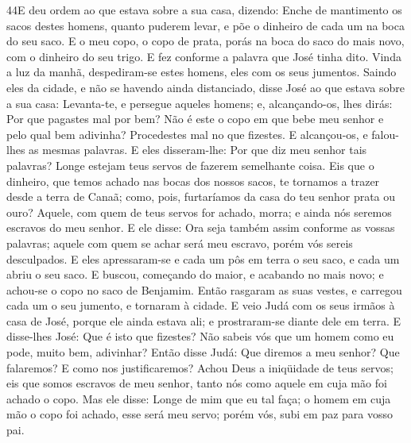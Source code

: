 \lettrine{44} E deu ordem ao que estava sobre a sua casa,
dizendo: Enche de mantimento os sacos destes homens, quanto puderem
levar, e põe o dinheiro de cada um na boca do seu saco. E o meu
copo, o copo de prata, porás na boca do saco do mais novo, com o
dinheiro do seu trigo. E fez conforme a palavra que José tinha dito.
Vinda a luz da manhã, despediram-se estes homens, eles com os
seus jumentos. Saindo eles da cidade, e não se havendo ainda
distanciado, disse José ao que estava sobre a sua casa: Levanta-te,
e persegue aqueles homens; e, alcançando-os, lhes dirás: Por que
pagastes mal por bem? Não é este o copo em que bebe meu senhor e
pelo qual bem adivinha? Procedestes mal no que fizestes. E
alcançou-os, e falou-lhes as mesmas palavras. E eles
disseram-lhe: Por que diz meu senhor tais palavras? Longe estejam
teus servos de fazerem semelhante coisa. Eis que o dinheiro, que
temos achado nas bocas dos nossos sacos, te tornamos a trazer desde
a terra de Canaã; como, pois, furtaríamos da casa do teu senhor
prata ou ouro? Aquele, com quem de teus servos for achado,
morra; e ainda nós seremos escravos do meu senhor. E ele
disse: Ora seja também assim conforme as vossas palavras; aquele com
quem se achar será meu escravo, porém vós sereis desculpados.
E eles apressaram-se e cada um pôs em terra o seu saco, e
cada um abriu o seu saco. E buscou, começando do maior, e
acabando no mais novo; e achou-se o copo no saco de Benjamim.
Então rasgaram as suas vestes, e carregou cada um o seu
jumento, e tornaram à cidade. E veio Judá com os seus irmãos
à casa de José, porque ele ainda estava ali; e prostraram-se diante
dele em terra. E disse-lhes José: Que é isto que fizestes?
Não sabeis vós que um homem como eu pode, muito bem, adivinhar?
Então disse Judá: Que diremos a meu senhor? Que falaremos? E
como nos justificaremos? Achou Deus a iniqüidade de teus servos; eis
que somos escravos de meu senhor, tanto nós como aquele em cuja mão
foi achado o copo. Mas ele disse: Longe de mim que eu tal
faça; o homem em cuja mão o copo foi achado, esse será meu servo;
porém vós, subi em paz para vosso pai.

